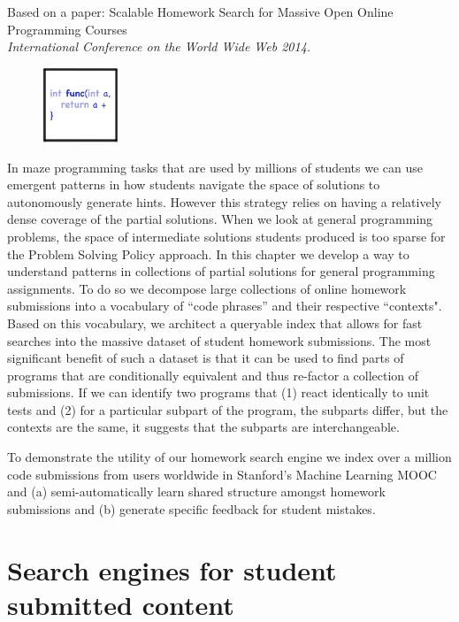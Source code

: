 Based on a paper: Scalable Homework Search for Massive Open
Online Programming Courses \cite{nguyen2014codewebs}\\ \emph{International Conference on the World Wide Web 2014.}

\vspace{7mm}

\begin{figure}[h!]
\includegraphics[width=0.2\textwidth]{img/assnType_4}
\end{figure}

\vspace{7mm}


In maze programming tasks that are used by millions of students we can use emergent patterns in how students navigate the space of solutions to autonomously generate hints. However this strategy relies on having a relatively dense coverage of the partial solutions. When we look at general programming problems, the space of intermediate solutions students produced is too sparse for the Problem Solving Policy approach. In this chapter we develop a way to understand patterns in collections of partial solutions for general programming assignments. To do so we decompose large collections of online homework submissions into a vocabulary of ``code phrases'' and their respective ``contexts". Based on this vocabulary, we architect a queryable index that allows for fast searches into the massive dataset of student homework submissions. The most significant benefit of such a dataset is that it can be used to find parts of programs that are conditionally equivalent and thus re-factor a collection of submissions. If we can identify two programs that (1) react identically to unit tests and (2) for a particular subpart of the program, the subparts differ, but the contexts are the same, it suggests that the subparts are interchangeable.

To demonstrate the utility of our homework search engine we index over a million code submissions from users worldwide in Stanford's Machine Learning MOOC and (a) semi-automatically learn shared structure amongst homework submissions and (b)  generate specific feedback for student mistakes. 


\section{Search engines for student submitted content}


